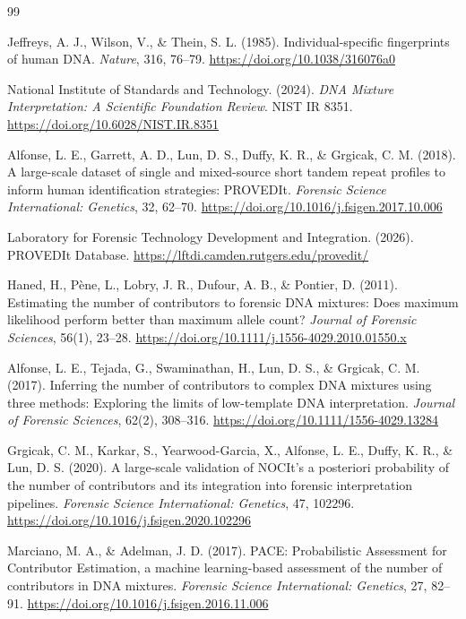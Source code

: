 \documentclass[12pt,a4paper]{article}
\begin{document}
\newpage
\begin{thebibliography}{99}

Jeffreys, A. J., Wilson, V., \& Thein, S. L. (1985).
Individual-specific fingerprints of human DNA.
\textit{Nature}, 316, 76--79.
\url{https://doi.org/10.1038/316076a0}

National Institute of Standards and Technology. (2024).
\textit{DNA Mixture Interpretation: A Scientific Foundation Review}.
NIST IR 8351.
\url{https://doi.org/10.6028/NIST.IR.8351}

Alfonse, L. E., Garrett, A. D., Lun, D. S., Duffy, K. R., \& Grgicak, C. M. (2018).
A large-scale dataset of single and mixed-source short tandem repeat profiles to inform human identification strategies: PROVEDIt.
\textit{Forensic Science International: Genetics}, 32, 62--70.
\url{https://doi.org/10.1016/j.fsigen.2017.10.006}

Laboratory for Forensic Technology Development and Integration. (2026).
PROVEDIt Database.
\url{https://lftdi.camden.rutgers.edu/provedit/}

Haned, H., Pène, L., Lobry, J. R., Dufour, A. B., \& Pontier, D. (2011).
Estimating the number of contributors to forensic DNA mixtures: Does maximum likelihood perform better than maximum allele count?
\textit{Journal of Forensic Sciences}, 56(1), 23--28.
\url{https://doi.org/10.1111/j.1556-4029.2010.01550.x}

Alfonse, L. E., Tejada, G., Swaminathan, H., Lun, D. S., \& Grgicak, C. M. (2017).
Inferring the number of contributors to complex DNA mixtures using three methods: Exploring the limits of low-template DNA interpretation.
\textit{Journal of Forensic Sciences}, 62(2), 308--316.
\url{https://doi.org/10.1111/1556-4029.13284}

Grgicak, C. M., Karkar, S., Yearwood-Garcia, X., Alfonse, L. E., Duffy, K. R., \& Lun, D. S. (2020).
A large-scale validation of NOCIt's a posteriori probability of the number of contributors and its integration into forensic interpretation pipelines.
\textit{Forensic Science International: Genetics}, 47, 102296.
\url{https://doi.org/10.1016/j.fsigen.2020.102296}

Marciano, M. A., \& Adelman, J. D. (2017).
PACE: Probabilistic Assessment for Contributor Estimation, a machine learning-based assessment of the number of contributors in DNA mixtures.
\textit{Forensic Science International: Genetics}, 27, 82--91.
\url{https://doi.org/10.1016/j.fsigen.2016.11.006}


\end{thebibliography}
\end{document}

